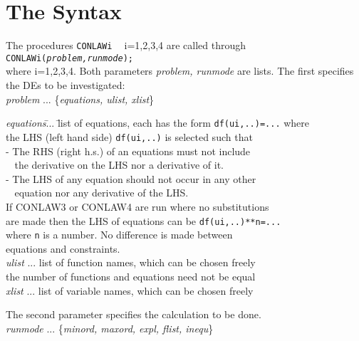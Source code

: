 \documentclass[12pt]{article}
\begin{document}
\section{The Syntax}
The procedures {\tt CONLAWi} $\;\;$ i=1,2,3,4 are called through \\
{\tt CONLAWi({\it problem,runmode}); } \\
where i=1,2,3,4. Both parameters {\it problem, runmode} are lists.
The first specifies the DEs to be investigated: \\
{\it problem} ... \{{\it equations, ulist, xlist}\}
\begin{tabbing}
\hspace{0.5cm}
 {\it equations}\= ... \= list of equations,
              each has the form {\tt df(ui,..)=...} where \\
       \>  \> the LHS (left hand side) {\tt df(ui,..)} is selected such that \\
       \>  \>  - The RHS (right h.s.) of an equations must not include     \\
       \>  \>$\;\;$ the derivative on the LHS nor a derivative of it.  \\
       \>  \>  - The LHS of any equation should not occur in any other\\
       \>  \>$\;\;$ equation nor any derivative of the LHS.  \\
       \>  \> If CONLAW3 or CONLAW4 are run where no substitutions\\
       \>  \> are made then the LHS of equations can be {\tt df(ui,..)**n=...}\\
       \>  \> where {\tt n} is a number. No difference is made between\\
       \>  \> equations and constraints. \\
\hspace{0.5cm}
 {\it ulist} \>  ... \> list of function names, which can be chosen freely \\
             \>      \> the number of functions and equations need not
be equal \\
\hspace{0.5cm}
 {\it xlist}  \>  ... \> list of variable names, which can be chosen freely
\end{tabbing}
The second parameter specifies the calculation to be done.  \\
{\it runmode} ... \{{\it minord, maxord, expl, flist, inequ}\}
\end{document}
